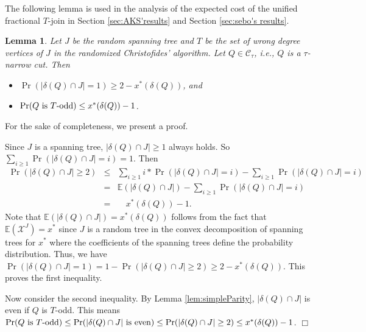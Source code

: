 \documentclass[11pt]{article}
\newcommand{\qed}{\hspace*{\fill}$\Box$}
\newtheorem{lemma}[theorem]{Lemma}
\newenvironment{proof}[1][Proof. ]{\noindent {\bf #1 }}{\qed}
\begin{document}
The following lemma is used in the analysis of the expected cost of the unified fractional $T$-join in
Section \ref{sec:AKS'results} and Section \ref{sec:sebo's results}.

\begin{lemma}\cite{AKS12}\cite{sebo13}\label{lem:probBound}
Let $J$ be the random spanning tree and
$T$ be the set of wrong degree vertices of $J$ in the
randomized Christofides' algorithm.
Let $Q\in \mathcal{C}_\tau$, i.e., $Q$ is a $\tau$-narrow cut.
Then
\begin{itemize}
\item[(i)]
$\Pr(|\delta(Q) \cap J|=1) \geq 2-x^*(\delta(Q))$, and
\item[(ii)]
$\Pr(Q\ \textnormal{is} \ T\textnormal{-odd}) \leq x^*(\delta(Q))-1$.
\end{itemize}
\end{lemma}

\vspace{2mm}

For the sake of completeness, we present a proof.
\vspace{3mm}

\begin{proof}
Since $J$ is a spanning tree, $|\delta(Q) \cap J|\geq 1$ always holds.
So $\sum_{i\geq 1} \Pr(|\delta(Q) \cap J|=i)=1$. Then
\begin{eqnarray}
\Pr(|\delta(Q) \cap J|\geq 2)&\leq& \sum_{i\geq 1} i*\Pr(|\delta(Q) \cap J|= i)-\sum_{i\geq 1} \Pr(|\delta(Q) \cap J|=i)\nonumber \\
                             &=& \mathbb{E}(|\delta(Q) \cap J|)-\sum_{i\geq 1} \Pr(|\delta(Q) \cap J|=i)\nonumber \\
    &=&\quad x^*(\delta(Q))-1. \nonumber
\end{eqnarray}
Note that $\mathbb{E}(|\delta(Q) \cap J|)=x^*(\delta(Q))$ follows from the fact that $\mathbb{E}(\mathcal{X}^J)=x^*$ since $J$ is a random tree in the convex decomposition
of spanning trees for $x^*$ where the coefficients of the spanning trees define the probability distribution. Thus, we have
$\Pr(|\delta(Q) \cap J|=1) =
1-\Pr(|\delta(Q) \cap J|\geq 2)\geq 2-x^*(\delta(Q))$.
This proves the first inequality.

Now consider the second inequality.
By Lemma \ref{lem:simpleParity}, $|\delta(Q) \cap J|$ is even if $Q$ is $T$-odd.
This means $\Pr(Q\ \textnormal{is} \ T\textnormal{-odd}) \leq
\Pr(|\delta(Q) \cap J| \ \textnormal{is} \ \textnormal{even}) \leq
\Pr(|\delta(Q) \cap J|\geq 2) \leq x^*(\delta(Q))-1$.
\end{proof}
\end{document}

